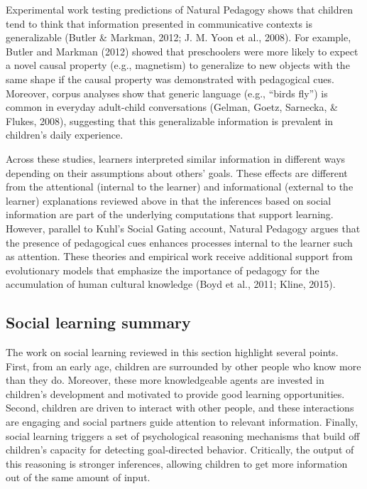 \documentclass[english,floatsintext,man]{apa6}
\theoremstyle{definition}
\theoremstyle{definition}
\theoremstyle{definition}
\theoremstyle{remark}
\begin{document}
Experimental work testing predictions of Natural Pedagogy shows that
children tend to think that information presented in communicative
contexts is generalizable (Butler \& Markman, 2012; J. M. Yoon et al.,
2008). For example, Butler and Markman (2012) showed that preschoolers
were more likely to expect a novel causal property (e.g., magnetism) to
generalize to new objects with the same shape if the causal property was
demonstrated with pedagogical cues. Moreover, corpus analyses show that
generic language (e.g., \enquote{birds fly}) is common in everyday
adult-child conversations (Gelman, Goetz, Sarnecka, \& Flukes, 2008),
suggesting that this generalizable information is prevalent in
children's daily experience.

Across these studies, learners interpreted similar information in
different ways depending on their assumptions about others' goals. These
effects are different from the attentional (internal to the learner) and
informational (external to the learner) explanations reviewed above in
that the inferences based on social information are part of the
underlying computations that support learning. However, parallel to
Kuhl's Social Gating account, Natural Pedagogy argues that the presence
of pedagogical cues enhances processes internal to the learner such as
attention. These theories and empirical work receive additional support
from evolutionary models that emphasize the importance of pedagogy for
the accumulation of human cultural knowledge (Boyd et al., 2011; Kline,
2015).

\subsection{Social learning summary}\label{social-learning-summary}

The work on social learning reviewed in this section highlight several
points. First, from an early age, children are surrounded by other
people who know more than they do. Moreover, these more knowledgeable
agents are invested in children's development and motivated to provide
good learning opportunities. Second, children are driven to interact
with other people, and these interactions are engaging and social
partners guide attention to relevant information. Finally, social
learning triggers a set of psychological reasoning mechanisms that build
off children's capacity for detecting goal-directed behavior.
Critically, the output of this reasoning is stronger inferences,
allowing children to get more information out of the same amount of
input.
\end{document}
